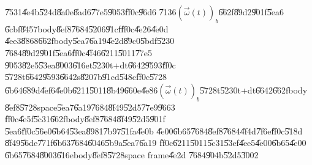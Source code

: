 \documentclass[12pt]{article}
\begin{document}
\U{7531}\U{4e4b}\U{524d}\U{8a0e}\U{8ad6}\U{77e5}\U{9053}\U{ff0c}\U{96d6}%
\U{7136}$\left( \vec{\omega}(t)\right) _{b}$\U{662f}\U{89d2}\U{901f}\U{5ea6}%
\U{6cbf}\U{8457}body\U{8ef8}\U{7684}\U{5206}\U{91cf}\U{ff0c}\U{4e26}\U{4e0d}%
\U{4ee3}\U{8868}\U{662f}body\U{5ea7}\U{6a19}\U{4e2d}\U{89c0}\U{5bdf}\U{5230}%
\U{7684}\U{89d2}\U{901f}\U{5ea6}\U{ff0c}\U{4f46}\U{6211}\U{5011}\U{77e5}%
\U{9053}\U{82e5}\U{53ea}\U{8003}\U{616e}t\U{5230}t+dt\U{6642}\U{9593}\U{ff0c}%
\U{5728}t\U{6642}\U{9593}\U{6642}s\U{8207}b\U{91cd}\U{548c}\U{ff0c}\U{5728}%
\U{6b64}\U{689d}\U{4ef6}\U{4e0b}\U{6211}\U{5011}\U{8b49}\U{660e}\U{4e86}$%
\left( \vec{\omega}(t)\right) _{b}$\U{5728}t\U{5230}t+dt\U{6642}\U{662f}body%
\U{8ef8}\U{5728}space\U{5ea7}\U{6a19}\U{7684}\U{8f49}\U{52d5}\U{77e9}\U{9663}%
\U{ff0c}\U{4e5f}\U{5c31}\U{662f}body\U{8ef8}\U{7684}\U{8f49}\U{52d5}\U{901f}%
\U{5ea6}\U{ff0c}\U{56e0}\U{6b64}\U{53ea}\U{8981}\U{7b97}\U{51fa}\U{4e0b}%
\U{4e00}\U{6b65}\U{7684}\U{8ef8}\U{7684}\U{4f4d}\U{7f6e}\U{ff0c}\U{518d}%
\U{8f49}\U{56de}\U{771f}\U{6b63}\U{7684}\U{6046}\U{5b9a}\U{5ea7}\U{6a19}%
\U{ff0c}\U{6211}\U{5011}\U{5c31}\U{53ef}\U{4ee5}\U{4e00}\U{6b65}\U{4e00}%
\U{6b65}\U{7684}\U{8003}\U{616e}body\U{8ef8}\U{5728}space frame\U{4e2d}%
\U{7684}\U{904b}\U{52d5}\U{3002}\bigskip 
\end{document}
